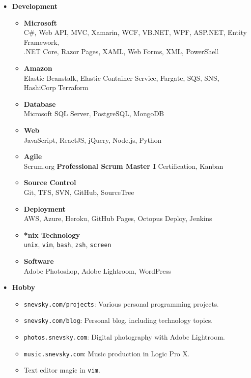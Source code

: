 \documentclass[letterpaper,11pt]{article}
\newcommand{\resitem}[1]{\item #1 \vspace{-2pt}}
\begin{document}
\begin{itemize}

    \item {\bf Development}

        \begin{itemize}
            \resitem{\textbf{Microsoft} \\ C\#, Web API, MVC, Xamarin, WCF, VB.NET, WPF, ASP.NET, 
            Entity Framework, \\ .NET Core, Razor Pages, XAML, Web Forms, XML, PowerShell}
            \resitem{\textbf{Amazon} \\ Elastic Beanstalk, Elastic Container Service, Fargate, SQS, SNS, HashiCorp Terraform}
            \resitem{\textbf{Database} \\ Microsoft SQL Server, PostgreSQL, MongoDB}
            \resitem{\textbf{Web} \\ JavaScript, ReactJS, jQuery, Node.js, Python}
            \resitem{\textbf{Agile} \\ Scrum.org \textbf{Professional Scrum Master I} Certification, Kanban}
            \resitem{\textbf{Source Control} \\ Git, TFS, SVN, GitHub, SourceTree}
            \resitem{\textbf{Deployment} \\ AWS, Azure, Heroku, GitHub Pages, Octopus Deploy, Jenkins}
            \resitem{\textbf{*nix Technology} \\ \texttt{unix}, \texttt{vim}, \texttt{bash}, \texttt{zsh}, \texttt{screen}}
            \resitem{\textbf{Software} \\ Adobe Photoshop, Adobe Lightroom, WordPress}
        \end{itemize}

    \item {\bf Hobby} 

      \begin{itemize}
          \resitem{\texttt{snevsky.com/projects}: Various personal programming projects.}
          \resitem{\texttt{snevsky.com/blog}: Personal blog, including technology topics.}
          \resitem{\texttt{photos.snevsky.com}: Digital photography with Adobe Lightroom.}
          \resitem{\texttt{music.snevsky.com}: Music production in Logic Pro X.}
          \resitem{Text editor magic in \texttt{vim}.}
      \end{itemize}


\end{itemize}
\end{document}
